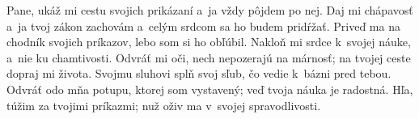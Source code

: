 Pane, ukáž mi cestu svojich prikázaní
a~ja vždy pôjdem po nej.
\versseparator
Daj mi chápavosť a~ja tvoj zákon zachovám
a~celým srdcom sa ho budem pridŕžať.
\versseparator
Priveď ma na chodník svojich príkazov,
lebo som si ho obľúbil.
\versseparator
Nakloň mi srdce k~svojej náuke,
a~nie ku chamtivosti.
\versseparator
Odvráť mi oči, nech nepozerajú na márnosť;
na tvojej ceste dopraj mi života.
\versseparator
Svojmu sluhovi splň svoj sľub,
čo vedie k~bázni pred tebou.
\versseparator
Odvráť odo mňa potupu, ktorej som vystavený;
veď tvoja náuka je radostná.
\versseparator
Hľa, túžim za tvojimi príkazmi;
nuž oživ ma v~svojej spravodlivosti.